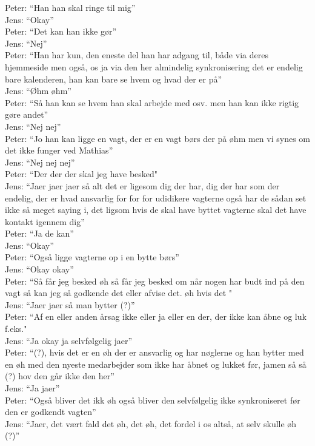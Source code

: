 Peter: “Han han skal ringe til mig”\\
Jens: “Okay”\\
Peter: “Det kan han ikke gør”\\
Jens: “Nej”\\
Peter: “Han har kun, den eneste del han har adgang til, både via deres hjemmeside men også, os ja via den her almindelig synkronisering det er endelig bare kalenderen, han kan bare se hvem og hvad der er på”\\
Jens: “Øhm øhm”\\
Peter: “Så han kan se hvem han skal arbejde med osv. men han kan ikke rigtig gøre andet”\\
Jens: “Nej nej”\\
Peter: “Jo han kan ligge en vagt, der er en vagt børs der på øhm men vi synes om det ikke funger ved Mathias”\\
Jens: “Nej nej nej”\\
Peter: “Der der der skal jeg have besked"\\
Jens: “Jaer jaer jaer så alt det er ligesom dig der har, dig der har som der endelig, der er hvad ansvarlig for for for udidikere vagterne også har de sådan set ikke så  meget saying i, det ligsom hvis de skal have byttet vagterne skal det have kontakt igennem dig”\\
Peter: “Ja de kan”\\
Jens: “Okay”\\
Peter: “Også ligge vagterne op i en bytte børs”\\
Jens: “Okay okay”\\
Peter: “Så får jeg besked øh så får jeg besked om når nogen har budt ind på den vagt så kan jeg så godkende det eller afvise det. øh hvis det "\\
Jens: “Jaer jaer så man bytter (?)”\\
Peter: “Af en eller anden årsag ikke eller ja eller en der, der ikke kan åbne og luk f.eks."\\
Jens: “Ja okay ja selvfølgelig jaer”\\
Peter: “(?), hvis det er en øh der er ansvarlig og har nøglerne og han bytter med en øh med den nyeste medarbejder som ikke har åbnet og lukket før, jamen så så (?) hov den går ikke den her”\\
Jens: “Ja jaer”\\
Peter: “Også bliver det ikk øh også bliver den selvfølgelig ikke synkroniseret før den er godkendt vagten”\\
Jens: “Jaer, det vært fald det øh, det øh, det fordel i os altså, at selv skulle øh (?)”\\

